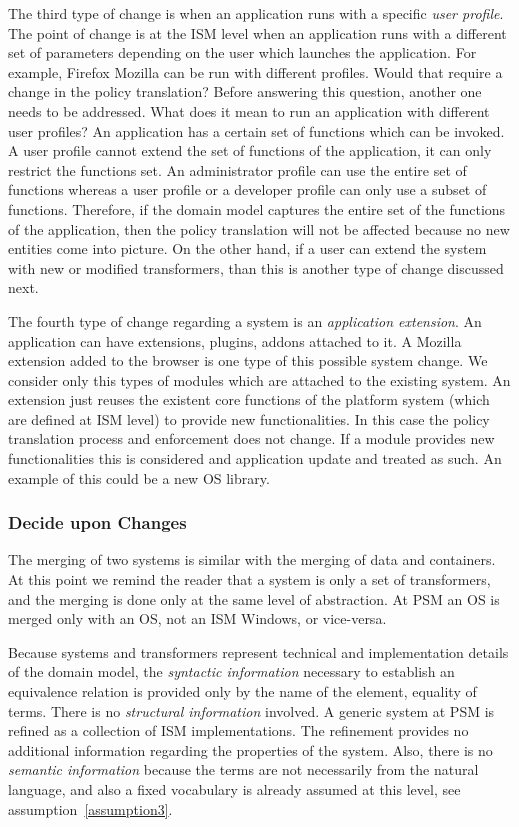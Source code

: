 \documentclass{sig-alternate}
\begin{document}
The third type of change is when an application runs with a specific \textit{user profile}.
The point of change is at the ISM level when an application runs with a different set of parameters depending on the user which launches the application.
For example, Firefox Mozilla can be run with different profiles.
Would that require a change in the policy translation? Before answering this question, another one needs to be addressed.
What does it mean to run an application with different user profiles?
An application has a certain set of functions which can be invoked.
A user profile cannot extend the set of functions of the application, it can only restrict the functions set.
An administrator profile can use the entire set of functions whereas a user profile or a developer profile can only use a subset of functions.
Therefore, if the domain model captures the entire set of the functions of the application,
then the policy translation will not be affected because no new entities come into picture.
On the other hand, if a user can extend the system with new or modified transformers, than this is another type of change discussed next.

The fourth type of change regarding a system is an \textit{application extension}.
An application can have extensions, plugins, addons attached to it.
A Mozilla extension added to the browser is one type of this possible system change.
We consider only this types of modules which are attached to the existing system.
An extension just reuses the existent core functions of the platform system (which are defined at ISM level) to provide new functionalities.
In this case the policy translation process and enforcement does not change. 
If a module provides new functionalities this is considered and application update and treated as such.
An example of this could be a new OS library.

\subsubsection{Decide upon Changes}
The merging of two systems is similar with the merging of data and containers.
At this point we remind the reader that a system is only a set of transformers,
and the merging is done only at the same level of abstraction.
At PSM an OS is merged only with an OS, not an ISM Windows, or vice-versa.

Because systems and transformers represent technical and implementation details of the domain model,
the \textit{syntactic information} necessary to establish an equivalence relation
is provided only by the name of the element, equality of terms.
There is no \textit{structural information} involved. A generic system at PSM is refined as a collection of ISM implementations.
The refinement provides no additional information regarding the properties of the system.
Also, there is no \textit{semantic information} because the terms are not necessarily from the natural language,
and also a fixed vocabulary is already assumed at this level, see assumption~\ref{assumption3}.
\end{document}
